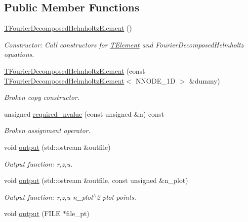 \subsection*{Public Member Functions}
\begin{DoxyCompactItemize}
\item 
\hyperlink{classoomph_1_1TFourierDecomposedHelmholtzElement_aaf727b0a259c73f1622c5c7ea3cff902}{T\+Fourier\+Decomposed\+Helmholtz\+Element} ()
\begin{DoxyCompactList}\small\item\em Constructor\+: Call constructors for \hyperlink{classoomph_1_1TElement}{T\+Element} and Fourier\+Decomposed\+Helmholtz equations. \end{DoxyCompactList}\item 
\hyperlink{classoomph_1_1TFourierDecomposedHelmholtzElement_ac79fd4aad6d66e90e7f8c0317bb2f26d}{T\+Fourier\+Decomposed\+Helmholtz\+Element} (const \hyperlink{classoomph_1_1TFourierDecomposedHelmholtzElement}{T\+Fourier\+Decomposed\+Helmholtz\+Element}$<$ N\+N\+O\+D\+E\+\_\+1D $>$ \&dummy)
\begin{DoxyCompactList}\small\item\em Broken copy constructor. \end{DoxyCompactList}\item 
unsigned \hyperlink{classoomph_1_1TFourierDecomposedHelmholtzElement_ad1275febec81a4962ccfee449f2cf391}{required\+\_\+nvalue} (const unsigned \&n) const
\begin{DoxyCompactList}\small\item\em Broken assignment operator. \end{DoxyCompactList}\item 
void \hyperlink{classoomph_1_1TFourierDecomposedHelmholtzElement_acbbeefc2997cac4a50605f3fe107596b}{output} (std\+::ostream \&outfile)
\begin{DoxyCompactList}\small\item\em Output function\+: r,z,u. \end{DoxyCompactList}\item 
void \hyperlink{classoomph_1_1TFourierDecomposedHelmholtzElement_a1ee5d590a4d0bcd09e88a4016834a83f}{output} (std\+::ostream \&outfile, const unsigned \&n\+\_\+plot)
\begin{DoxyCompactList}\small\item\em Output function\+: r,z,u n\+\_\+plot$^\wedge$2 plot points. \end{DoxyCompactList}\item 
void \hyperlink{classoomph_1_1TFourierDecomposedHelmholtzElement_a5ff9eff472598398a2f31c30ff478e7d}{output} (F\+I\+LE $\ast$file\+\_\+pt)

\end{DoxyCompactItemize}
